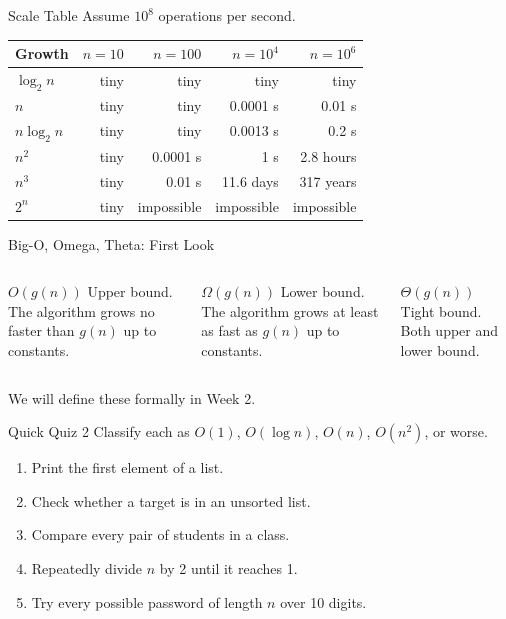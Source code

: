 \documentclass[aspectratio=169,xcolor=dvipsnames]{beamer}
\begin{document}
\begin{frame}{Scale Table}
  Assume $10^8$ operations per second.
  \begin{table}
    \centering
    \small
    \begin{tabular}{lrrrr}
      \toprule
      Growth & $n=10$ & $n=100$ & $n=10^4$ & $n=10^6$ \\
      \midrule
      $\log_2 n$ & tiny & tiny & tiny & tiny \\
      $n$ & tiny & tiny & 0.0001 s & 0.01 s \\
      $n\log_2 n$ & tiny & tiny & 0.0013 s & 0.2 s \\
      $n^2$ & tiny & 0.0001 s & 1 s & 2.8 hours \\
      $n^3$ & tiny & 0.01 s & 11.6 days & 317 years \\
      $2^n$ & tiny & impossible & impossible & impossible \\
      \bottomrule
    \end{tabular}
  \end{table}
\end{frame}

\begin{frame}{Big-O, Omega, Theta: First Look}
  \begin{columns}
    \begin{block}{$O(g(n))$}
      Upper bound. The algorithm grows no faster than $g(n)$ up to constants.
    \end{block}
    \begin{alertblock}{$\Omega(g(n))$}
      Lower bound. The algorithm grows at least as fast as $g(n)$ up to constants.
    \end{alertblock}
    \begin{exampleblock}{$\Theta(g(n))$}
      Tight bound. Both upper and lower bound.
    \end{exampleblock}
  \end{columns}
  \vspace{0.8em}
  We will define these formally in Week 2.
\end{frame}

\begin{frame}{Quick Quiz 2}
  Classify each as $O(1)$, $O(\log n)$, $O(n)$, $O(n^2)$, or worse.
  \begin{enumerate}
    \item Print the first element of a list.
    \item Check whether a target is in an unsorted list.
    \item Compare every pair of students in a class.
    \item Repeatedly divide $n$ by 2 until it reaches 1.
    \item Try every possible password of length $n$ over 10 digits.
  \end{enumerate}
\end{frame}
\end{document}
